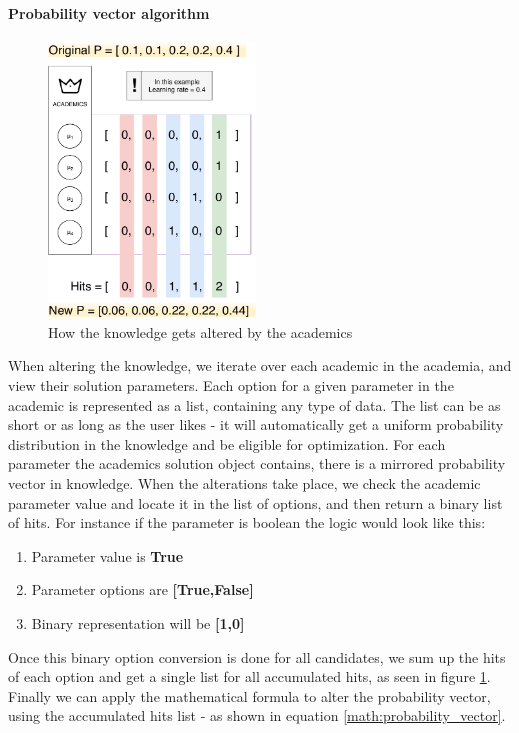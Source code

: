 \documentclass[a4paper,english]{report}
\begin{document}
		\paragraph{Probability vector algorithm}
		\begin{figure}
			\caption{How the knowledge gets altered by the academics}
			\label{fig:memory_insight}
			\includegraphics[width=5.5cm]{memory_insight}
		\end{figure} 
		When altering the knowledge, we iterate over each academic in the academia, and view their solution parameters. Each option for a given parameter in the academic is represented as a list, containing any type of data. The list can be as short or as long as the user likes - it will automatically get a uniform probability distribution in the knowledge and be eligible for optimization. For each parameter the academics solution object contains, there is a mirrored probability vector in knowledge. When the alterations take place, we check the academic parameter value and locate it in the list of options, and then return a binary list of hits. For instance if the parameter is boolean the logic would look like this:
		\begin{enumerate}
			\item Parameter value is \textbf{True}
			\item Parameter options are \textbf{[True,False]}
			\item Binary representation will be \textbf{[1,0]}
		\end{enumerate}
		Once this binary option conversion is done for all candidates, we sum up the hits of each option and get a single list for all accumulated hits, as seen in figure \ref{fig:memory_insight}. Finally we can apply the mathematical formula to alter the probability vector, using the accumulated hits list - as shown in equation \ref{math:probability_vector}.\\
\end{document}
